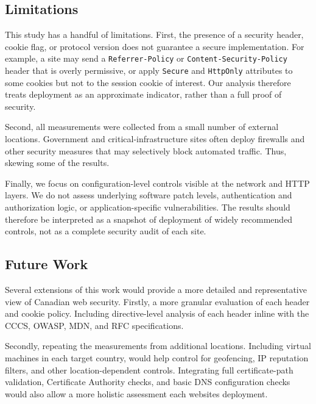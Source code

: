 \documentclass[pdflatex,sn-mathphys-num]{sn-jnl}
\numberwithin{equation}{section}
\theoremstyle{thmstyleone}
\theoremstyle{thmstyletwo}%
\theoremstyle{thmstylethree}%
\begin{document}
\subsection{Limitations}

This study has a handful of limitations. First, the presence of a security header, cookie flag, or protocol version 
does not guarantee a secure implementation. For example, a site may send a 
\texttt{Referrer-Policy} or \texttt{Content-Security-Policy} header that is overly permissive, or apply 
\texttt{Secure} and \texttt{HttpOnly} attributes to some cookies but not to the session cookie of interest. 
Our analysis therefore treats deployment as an approximate indicator, rather than a 
full proof of security.

\vspace{1em}Second, all measurements were collected from a small number of external locations. 
Government and critical-infrastructure sites often deploy firewalls and other security measures that may 
selectively block automated traffic. Thus, skewing some of the results. 

\vspace{1em}Finally, we focus on configuration-level controls visible at the network and HTTP layers. 
We do not assess underlying software patch levels, authentication and authorization logic, or application-specific 
vulnerabilities. The results should therefore be interpreted as a snapshot of deployment of widely recommended 
controls, not as a complete security audit of each site.


\subsection{Future Work}

Several extensions of this work would provide a more detailed and representative view of Canadian web security. 
Firstly, a more granular evaluation of each header and cookie policy. Including directive-level analysis of each header
inline with the CCCS, OWASP, MDN, and RFC specifications.

\vspace{1em}Secondly, repeating the measurements from additional locations. Including virtual machines in 
each target country, would help control for geofencing, IP reputation filters, and other location-dependent 
controls. Integrating full certificate-path validation, Certificate Authority checks, and basic DNS configuration checks 
would also allow a more holistic assessment each websites deployment. 
\end{document}
